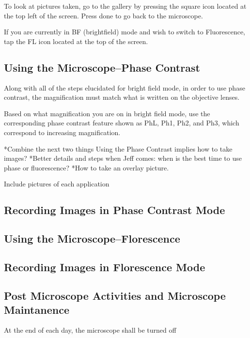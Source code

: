 \documentclass[12pt]{../SOP2}
\begin{document}
\NP To look at pictures taken, go to the gallery by pressing the square icon located at the top left of the screen. Press done to go back to the microscope. 

\NP If you are currently in BF (brightfield) mode and wish to switch to Fluorescence, tap the FL icon located at the top of the screen.  

\subsection*{Using the Microscope--Phase Contrast}

\NP Along with all of the steps elucidated for bright field mode, in order to use phase contrast, the magnification must match what is written on the objective lenses.

\NP Based on what magnification you are on in bright field mode, use the corresponding phase contrast feature shown as PhL, Ph1, Ph2, and Ph3, which correspond to increasing magnification. 

*Combine the next two things Using the Phase Contrast implies how to take images?
*Better details and steps when Jeff comes: when is the best time to use phase or fluorescence? 
*How to take an overlay picture.

Include pictures of each application 

\subsection*{Recording Images in Phase Contrast Mode}



\subsection*{Using the Microscope--Florescence}



\subsection*{Recording Images in Florescence Mode}

\subsection*{Post Microscope Activities and Microscope Maintanence}

\NP At the end of each day, the microscope shall be turned off 
\end{document}
